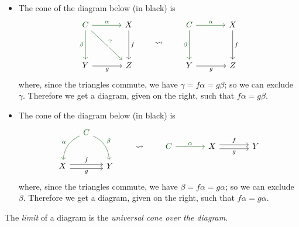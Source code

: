 \begin{attempt-definition}
\begin{example}\hfill
\begin{itemize}
\item The cone of the diagram below (in black) is
\[\begin{tikzcd}[row sep=huge, column sep = large]
{\color{darkgreen}C} \arrow[d, "\beta"',darkgreen] \arrow[r, "\alpha",darkgreen] \arrow[rd, "\gamma",darkgreen] & X \arrow[d, "f"] \\
Y \arrow[r, "g"']                                              & Z               
\end{tikzcd}
\qquad
\rightsquigarrow
\qquad
\begin{tikzcd}[row sep=huge, column sep = large]
{\color{darkgreen}C} \arrow[d, "\beta"',darkgreen] \arrow[r, "\alpha",darkgreen] & X \arrow[d, "f"] \\
Y \arrow[r, "g"']                                              & Z               
\end{tikzcd}\]
where, since the triangles commute, we have $\gamma = f\alpha = g\beta$; so we can exclude $\gamma$. Therefore we get a diagram, given on the right, such that $f\alpha = g\beta$.
\item The cone of the diagram below (in black) is
\[\begin{tikzcd}[column sep=small, row sep = large]
                                                            & {\color{darkgreen}C} \arrow[ld, "\alpha"', bend right,darkgreen] \arrow[rd, "\beta", bend left,darkgreen] &   \\
X \arrow[rr, "f", shift left] \arrow[rr, "g"', shift right] &                                                                    & Y
\end{tikzcd}
\qquad
\rightsquigarrow
\qquad
\begin{tikzcd}[column sep=large]
{\color{darkgreen}C} \arrow[r, "\alpha",darkgreen] & X \arrow[r, "f", shift left] \arrow[r, "g"', shift right] & Y
\end{tikzcd}\]
where, since the triangles commute, we have $\beta = f\alpha = g\alpha$; so we can exclude $\beta$. Therefore we get a diagram, given on the right, such that $f\alpha = g\alpha$.
\end{itemize}
\end{example}
\vspace*{0.1in}
\begin{definition}
The \emph{limit} of a diagram is the \emph{universal cone over the diagram}.
\end{definition}
\end{attempt-definition}

